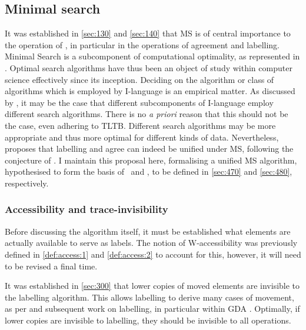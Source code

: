 \subsection{Minimal search}\label{sec:450}

It was established in \autoref{sec:130} and \autoref{sec:140} that MS is of central importance to the operation of \CHL, in particular in the operations of agreement and labelling. Minimal Search is a subcomponent of computational optimality, as represented in . Optimal search algorithms have thus been an object of study within computer science effectively since its inception. Deciding on the algorithm or class of algorithms which is employed by I-language is an empirical matter. As discussed by \textcite{KeH_2019,KeH_2021}, it may be the case that different subcomponents of I-language employ different search algorithms. There is no \textit{a priori} reason that this should not be the case, even adhering to TLTB. Different search algorithms may be more appropriate and thus more optimal for different kinds of data. Nevertheless, \textcite{KeH_2019} proposes that labelling and agree can indeed be unified under MS, following the conjecture of \textcite{ChomskyN_2013,ChomskyN_2015}. I maintain this proposal here, formalising a unified MS algorithm, hypothesised to form the basis of \Label\ and \Agree, to be defined in \autoref{sec:470} and \autoref{sec:480}, respectively.

\subsubsection{Accessibility and trace-invisibility}

Before discussing the algorithm itself, it must be established what elements are actually available to serve as labels. The notion of W-accessibility was previously defined in \autoref{def:access:1} and \autoref{def:access:2} to account for this, however, it will need to be revised a final time.

It was established in \autoref{sec:300} that lower copies of moved elements are invisible to the labelling algorithm. This allows labelling to derive many cases of movement, as per \textcite{ChomskyN_2013} and subsequent work on labelling, in particular within GDA \parencite{MoroA.RobertsI_2020}. Optimally, if lower copies are invisible to labelling, they should be invisible to all operations.

